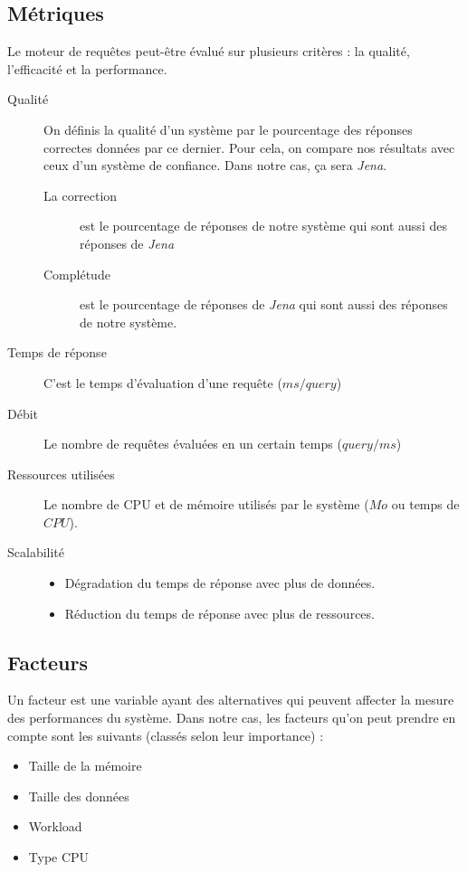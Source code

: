 \documentclass[12pt,titlepage]{article}
\begin{document}
\subsection{Métriques}

Le moteur de requêtes peut-être évalué sur plusieurs critères : la qualité, l'efficacité et la performance.


\begin{description}
\item[Qualité] On définis la qualité d'un système par le pourcentage des réponses correctes données par ce dernier. Pour cela, on compare nos résultats avec ceux d'un système de confiance. Dans notre cas, ça sera \textit{Jena}.

\begin{description}
\item[La correction] est le pourcentage de réponses de notre système qui sont aussi des réponses de \textit{Jena}
\item[Complétude] est le pourcentage de réponses de \textit{Jena} qui sont aussi des réponses de notre système.
\end{description}

\item[Temps de réponse] C'est le temps d'évaluation d'une requête ($ms / query$)
\item[Débit] Le nombre de requêtes évaluées en un certain temps ($query / ms$)
\item[Ressources utilisées] Le nombre de CPU et de mémoire utilisés par le système ($Mo$ ou temps de $CPU$).
\item[Scalabilité]
\begin{itemize}
\item Dégradation du temps de réponse avec plus de données.
\item Réduction du temps de réponse avec plus de ressources.
\end{itemize}
\end{description}
\subsection{Facteurs}

Un facteur est une variable ayant des alternatives qui peuvent affecter la mesure des performances du système. Dans notre cas, les facteurs qu'on peut prendre en compte sont les suivants (classés selon leur importance) :

\begin{itemize}
  \item Taille de la mémoire
  \item Taille des données
  \item Workload
  \item Type CPU
\end{itemize}
\end{document}
